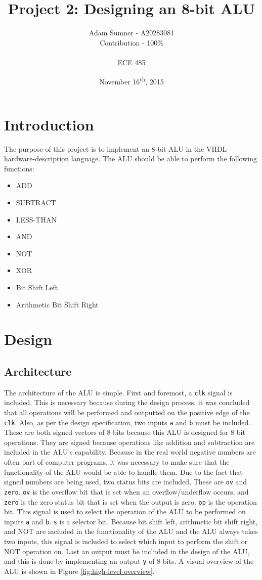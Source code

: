 \documentclass[12pt]{article}
\title{Project 2: Designing an 8-bit ALU}
\author{Adam Sumner - A20283081 \\ Contribution - 100\% \\ ~\\ ECE 485}
\date{November 16\textsuperscript{th}, 2015}
\begin{document}
\maketitle

\section{Introduction}
The purpose of this project is to implement an 8-bit ALU in the VHDL hardware-description language. The ALU should be able to perform the following functions:
\begin{itemize}
	\item ADD
	\item SUBTRACT
	\item LESS-THAN
	\item AND
	\item NOT
	\item XOR
	\item Bit Shift Left
	\item Arithmetic Bit Shift Right
\end{itemize}
\section{Design}
\subsection{Architecture}
The architecture of the ALU is simple. First and foremost, a \texttt{clk} signal is included. This is necessary because during the design process, it was concluded that all operations will be performed and outputted on the positive edge of the \texttt{clk}. Also, as per the design specification, two inputs \texttt{a} and \texttt{b} must be included. These are both signed vectors of 8 bits because this ALU is designed for 8 bit operations. They are signed because operations like addition and subtraction are included in the ALU's capability. Because in the real world negative numbers are often part of computer programs, it was necessary to make sure that the functionality of the ALU would be able to handle them. Due to the fact that signed numbers are being used, two status bits are included. These are \texttt{ov} and \texttt{zero}. \texttt{ov} is the overflow bit that is set when an overflow/underflow occurs, and \texttt{zero} is the zero status bit that is set when the output is zero. \texttt{op} is the operation bit. This signal is used to select the operation of the ALU to be performed on inputs \texttt{a} and \texttt{b}. \texttt{s} is a selector bit. Because bit shift left, arithmetic bit shift right, and NOT are included in the functionality of the ALU and the ALU always takes two inputs, this signal is included to select which input to perform the shift or NOT operation on. Last an output must be included in the design of the ALU, and this is done by implementing an output \texttt{y} of 8 bits. A visual overview of the ALU is shown in Figure \ref{fig:high-level-overview}.
\end{document}
